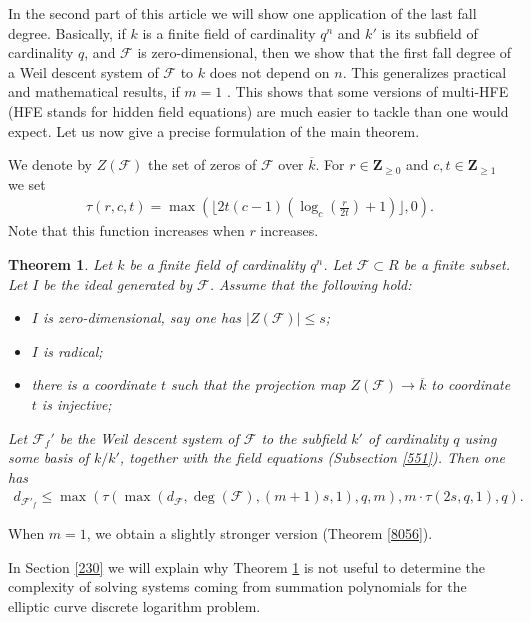 \documentclass{amsart}
\theoremstyle{plain}
\newtheorem{theorem}{Theorem}[section]
\theoremstyle{definition}
\begin{document}
In the second part of this article we will show one application of the last fall degree. Basically, if $k$ is a finite field of cardinality $q^n$ and $k'$ is its subfield of cardinality $q$, and $\mathcal{F}$ is zero-dimensional, then we show that the first fall degree of a Weil descent system of $\mathcal{F}$ to $k$ does not depend on $n$. This generalizes practical and mathematical results, if $m=1$ \cite{BET, DIN, FAU3, PET2}. This shows that some versions of multi-HFE (HFE stands for hidden field equations) are much easier to tackle than one would expect. Let us now give a precise formulation of the main theorem.

We denote by $Z(\mathcal{F})$ the set of zeros of $\mathcal{F}$ over $\overline{k}$.
For $r \in {\mathbf{Z}}_{\geq 0}$ and $c, t \in {\mathbf{Z}}_{\geq 1}$ we set 
\begin{eqnarray*}
\tau(r,c,t)=\max\left( \lfloor 2 t(c-1) \left(\log_c\left(  \frac{r}{2t}\right)+1 \right) \rfloor,0\right).
\end{eqnarray*}
Note that this function increases when $r$ increases.

\begin{theorem} \label{1234}
Let $k$ be a finite field of cardinality $q^n$. Let $\mathcal{F} \subset R$ be a finite subset. Let $I$ be the ideal generated by $\mathcal{F}$. Assume that the following hold:
\begin{itemize}
\item $I$ is zero-dimensional, say one has $|Z(\mathcal{F})| \leq s$;
\item $I$ is radical;
\item there is a coordinate $t$ such that the projection map $Z(\mathcal{F}) \to \overline{k}$ to coordinate $t$ is injective;
\end{itemize}
Let $\mathcal{F}_f'$ be the Weil descent system of $\mathcal{F}$ to the subfield $k'$ of cardinality $q$ using some basis of $k/k'$, together with the field equations (Subsection \ref{551}). Then one has
\begin{eqnarray*}
d_{\mathcal{F}'_f} \leq \max\left(\tau(\max(d_{\mathcal{F}}, \deg(\mathcal{F}), (m+1)s,1),q,m),m \cdot \tau(2s,q,1), q \right).
\end{eqnarray*}
\end{theorem}

When $m=1$, we obtain a slightly stronger version (Theorem \ref{8056}).

In Section \ref{230} we will explain why Theorem \ref{1234} is not useful to determine the complexity of solving systems coming from summation polynomials for the elliptic curve discrete logarithm problem.
\end{document}

